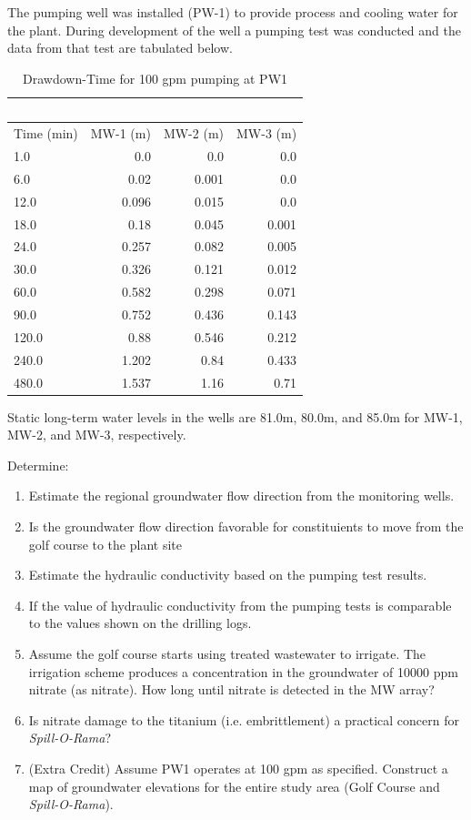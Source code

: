 \documentclass[12pt]{article}
\begin{document}
\begin{enumerate}
The pumping well was installed (PW-1) to provide process and cooling water for the plant. During development of the well a pumping test was conducted and the data from that test are tabulated below.

\begin{table}[h!]
\centering
\caption{Drawdown-Time for 100 gpm pumping at PW1}
\begin{tabular}{lrrr}
~&~&~&~\\
\hline
Time (min) & MW-1 (m) & MW-2 (m) & MW-3 (m) \\
\hline
1.0 & 0.0 & 0.0 & 0.0 \\
6.0 & 0.02 & 0.001 & 0.0 \\
12.0 & 0.096 & 0.015 & 0.0 \\
18.0 & 0.18 & 0.045 & 0.001 \\
24.0 & 0.257 & 0.082 & 0.005 \\
30.0 & 0.326 & 0.121 & 0.012 \\
60.0 & 0.582 & 0.298 & 0.071 \\
90.0 & 0.752 & 0.436 & 0.143 \\
120.0 & 0.88 & 0.546 & 0.212 \\
240.0 & 1.202 & 0.84 & 0.433 \\
480.0 & 1.537 & 1.16 & 0.71 \\
\hline
\end{tabular}
\end{table}

Static long-term water levels in the wells are 81.0m, 80.0m, and 85.0m for MW-1, MW-2, and MW-3, respectively.


Determine:

\begin{enumerate} %
\item Estimate the regional groundwater flow direction from the monitoring wells.
\item Is the groundwater flow direction favorable for constituients to move from the golf course to the plant site
\item Estimate the hydraulic conductivity based on the pumping test results.  
\item If the value of hydraulic conductivity from the pumping tests is comparable to the values shown on the drilling logs.
\item Assume the golf course starts using treated wastewater to irrigate. The irrigation scheme produces a concentration in the groundwater of 10000 ppm nitrate (as nitrate).  How long until nitrate is detected in the MW array?
\item Is nitrate damage to the titanium (i.e. embrittlement) a practical concern for \textsl{Spill-O-Rama}? 
\item (Extra Credit) Assume PW1 operates at 100 gpm as specified.  Construct a map of groundwater elevations for the entire study area (Golf Course and \textsl{Spill-O-Rama}).  
\end{enumerate} %


\end{enumerate}%
\end{document}
